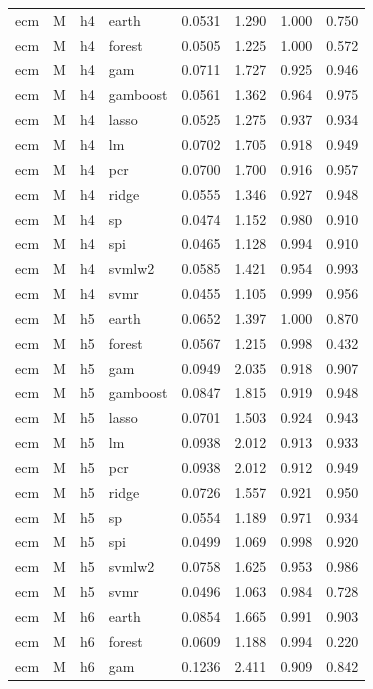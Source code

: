 \begin{ThreePartTable}
\begin{longtable}[t]{llclcccc}
\addlinespace
ecm & M & h4 & earth & 0.0531 & 1.290 & 1.000 & 0.750\\
ecm & M & h4 & forest & 0.0505 & 1.225 & 1.000 & 0.572\\
ecm & M & h4 & gam & 0.0711 & 1.727 & 0.925 & 0.946\\
ecm & M & h4 & gamboost & 0.0561 & 1.362 & 0.964 & 0.975\\
ecm & M & h4 & lasso & 0.0525 & 1.275 & 0.937 & 0.934\\
ecm & M & h4 & lm & 0.0702 & 1.705 & 0.918 & 0.949\\
ecm & M & h4 & pcr & 0.0700 & 1.700 & 0.916 & 0.957\\
ecm & M & h4 & ridge & 0.0555 & 1.346 & 0.927 & 0.948\\
ecm & M & h4 & sp & 0.0474 & 1.152 & 0.980 & 0.910\\
ecm & M & h4 & spi & 0.0465 & 1.128 & 0.994 & 0.910\\
ecm & M & h4 & svmlw2 & 0.0585 & 1.421 & 0.954 & 0.993\\
ecm & M & h4 & svmr & 0.0455 & 1.105 & 0.999 & 0.956\\
\addlinespace
ecm & M & h5 & earth & 0.0652 & 1.397 & 1.000 & 0.870\\
ecm & M & h5 & forest & 0.0567 & 1.215 & 0.998 & 0.432\\
ecm & M & h5 & gam & 0.0949 & 2.035 & 0.918 & 0.907\\
ecm & M & h5 & gamboost & 0.0847 & 1.815 & 0.919 & 0.948\\
ecm & M & h5 & lasso & 0.0701 & 1.503 & 0.924 & 0.943\\
ecm & M & h5 & lm & 0.0938 & 2.012 & 0.913 & 0.933\\
ecm & M & h5 & pcr & 0.0938 & 2.012 & 0.912 & 0.949\\
ecm & M & h5 & ridge & 0.0726 & 1.557 & 0.921 & 0.950\\
ecm & M & h5 & sp & 0.0554 & 1.189 & 0.971 & 0.934\\
ecm & M & h5 & spi & 0.0499 & 1.069 & 0.998 & 0.920\\
ecm & M & h5 & svmlw2 & 0.0758 & 1.625 & 0.953 & 0.986\\
ecm & M & h5 & svmr & 0.0496 & 1.063 & 0.984 & 0.728\\
\addlinespace
ecm & M & h6 & earth & 0.0854 & 1.665 & 0.991 & 0.903\\
ecm & M & h6 & forest & 0.0609 & 1.188 & 0.994 & 0.220\\
ecm & M & h6 & gam & 0.1236 & 2.411 & 0.909 & 0.842\\

\end{longtable}
\end{ThreePartTable}
